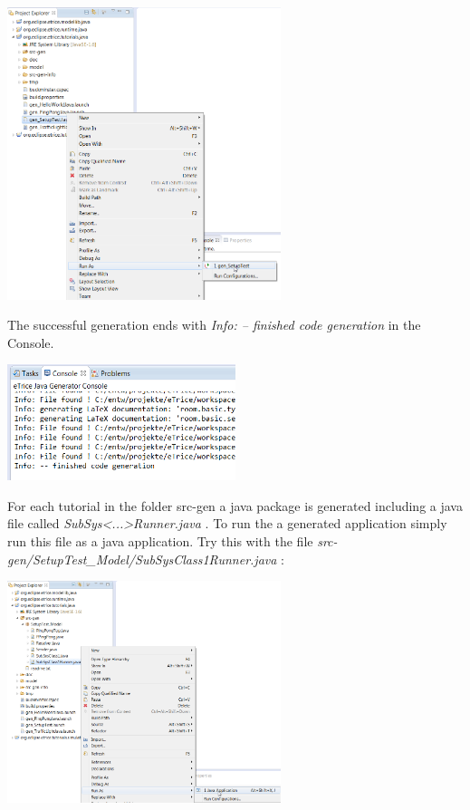 \includegraphics[width=0.6\textwidth]{images/013-SetupWorkspace05.png}

\newpage
The successful generation ends with \emph{Info: -- finished code generation} in the Console.

\includegraphics[width=0.5\textwidth]{images/013-SetupWorkspace051.png}

For each tutorial in the folder src-gen a java package is generated including a java file called 
\emph{SubSys<...>Runner.java} . To run the a generated application simply run this file as a java application.
Try this with the file \emph{src-gen/SetupTest\_Model/SubSysClass1Runner.java} :

\includegraphics[width=0.6\textwidth]{images/013-SetupWorkspace06.png}

